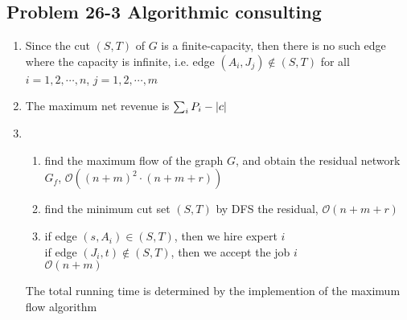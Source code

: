 \subsection*{Problem 26-3 Algorithmic consulting}
\begin{enumerate}
	\item	Since the cut $(S, T)$ of $G$ is a finite-capacity, then there is no such edge where the capacity is infinite, i.e. edge $(A_i, J_j) \notin (S, T)$ for all $i = 1, 2, \cdots, n$, $j = 1, 2, \cdots, m$
	\item	The maximum net revenue is $\sum_{i}{P_i} - \left\lvert c \right\rvert$
	\item	\begin{enumerate}
			\item	find the maximum flow of the graph $G$, and obtain the residual network $G_f$, $\mathcal{O}((n + m)^2 \cdot (n + m + r))$
			\item	find the minimum cut set $(S, T)$ by DFS the residual, $\mathcal{O}(n + m + r)$
			\item	if edge $(s, A_i) \in (S, T)$, then we hire expert $i$ \\
				if edge $(J_i, t) \notin (S, T)$, then we accept the job $i$ \\
				$\mathcal{O}(n + m)$
		\end{enumerate}
		The total running time is determined by the implemention of the maximum flow algorithm
\end{enumerate}


